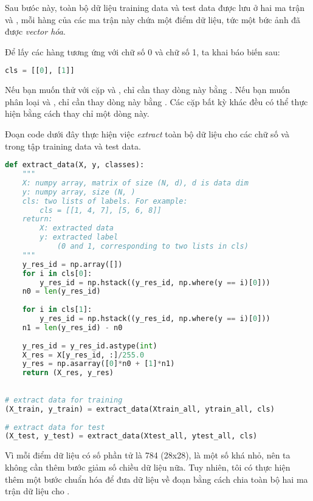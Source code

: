 Sau bưóc này, toàn bộ dữ liệu training data và test data được lưu ở hai ma trận  và , mỗi hàng của các ma trận này chứa một điểm dữ liệu, tức một bức ảnh đã được \textit{vector hóa}.  
 
Để lấy các hàng tương ứng với chữ số 0 và chữ số 1, ta khai báo biến sau: 
 
\begin{lstlisting}[language=Python]
cls = [[0], [1]] 
\end{lstlisting}
 
Nếu bạn muốn thử với cặp  và , chỉ cần thay dòng này bằng . Nếu bạn muốn phân loại  và , chỉ cần thay dòng này bằng . Các cặp bất kỳ khác đều có thể thực hiện bằng cách thay chỉ một dòng này.  
 
Đoạn code dưới đây thực hiện việc \textit{extract} toàn bộ dữ liệu cho các chữ số  và  trong tập training data và test data.  
 
\begin{lstlisting}[language=Python]
def extract_data(X, y, classes): 
    """ 
    X: numpy array, matrix of size (N, d), d is data dim 
    y: numpy array, size (N, ) 
    cls: two lists of labels. For example:  
        cls = [[1, 4, 7], [5, 6, 8]] 
    return: 
        X: extracted data 
        y: extracted label  
            (0 and 1, corresponding to two lists in cls) 
    """ 
    y_res_id = np.array([]) 
    for i in cls[0]: 
        y_res_id = np.hstack((y_res_id, np.where(y == i)[0])) 
    n0 = len(y_res_id) 
 
    for i in cls[1]: 
        y_res_id = np.hstack((y_res_id, np.where(y == i)[0])) 
    n1 = len(y_res_id) - n0  
 
    y_res_id = y_res_id.astype(int) 
    X_res = X[y_res_id, :]/255.0 
    y_res = np.asarray([0]*n0 + [1]*n1) 
    return (X_res, y_res) 
 
 
# extract data for training  
(X_train, y_train) = extract_data(Xtrain_all, ytrain_all, cls) 
 
# extract data for test  
(X_test, y_test) = extract_data(Xtest_all, ytest_all, cls) 
\end{lstlisting}
 
Vì mỗi điểm dữ liệu có số phần tử là 784 (28x28), là một số khá nhỏ, nên ta không cần thêm bước giảm số chiều dữ liệu nữa. Tuy nhiên, tôi có thực hiện thêm một bước chuẩn hóa để đưa dữ liệu về đoạn \pythoninline{[0, 1]} bằng cách chia toàn bộ hai ma trận dữ liệu cho . 
 

